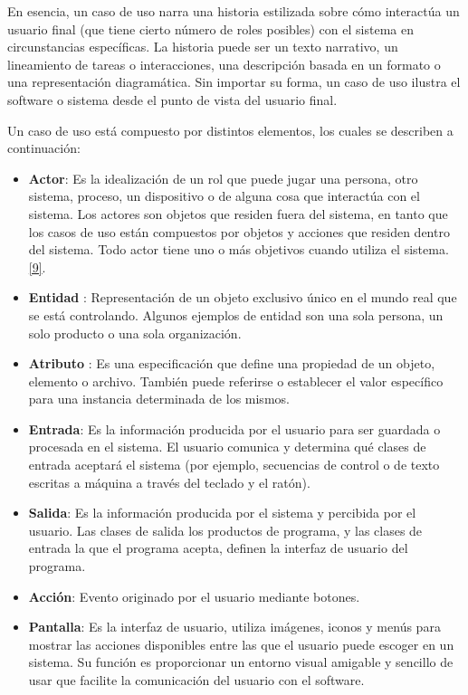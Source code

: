 En esencia, un caso de uso narra una historia estilizada sobre cómo interactúa un usuario final (que tiene cierto número de roles posibles) con el sistema en circunstancias específicas. La historia puede ser un texto narrativo, un lineamiento de tareas o interacciones, una descripción basada en un formato o una representación diagramática. Sin importar su forma, un caso de uso ilustra el software o sistema desde el punto de vista del usuario final.

Un caso de uso está compuesto por distintos elementos, los cuales se describen a continuación:
\begin{itemize}
\item \textbf{Actor}: Es la idealización de un rol que puede jugar una persona, otro sistema, proceso, un dispositivo o de alguna cosa que interactúa con el sistema. Los actores son objetos que residen fuera del sistema, en tanto que los casos de uso están compuestos por objetos y acciones que residen dentro del sistema. Todo actor tiene uno o más objetivos cuando utiliza el sistema.  \hyperlink{b09}{[9]}. 

\item \textbf{Entidad} : Representación de un objeto exclusivo único en el mundo real que se está controlando. Algunos ejemplos de entidad son una sola persona, un solo producto o una sola organización. 

\item \textbf{Atributo} : Es una especificación que define una propiedad de un objeto, elemento o archivo. También puede referirse o establecer el valor específico para una instancia determinada de los mismos.

\item \textbf{Entrada}: Es la información producida por el usuario para ser guardada o procesada en el sistema. El usuario comunica y determina qué clases de entrada aceptará el sistema (por ejemplo, secuencias de control o de texto escritas a máquina a través del teclado y el ratón).

\item \textbf{Salida}: Es la información producida por el sistema y percibida por el usuario. Las clases de salida los productos de programa, y las clases de entrada la que el programa acepta, definen la interfaz de usuario del programa.

\item \textbf{Acción}: Evento originado por el usuario mediante botones.

\item \textbf{Pantalla}: Es la interfaz de usuario, utiliza imágenes, iconos y menús para mostrar las acciones disponibles entre las que el usuario puede escoger en un sistema. Su función es proporcionar un entorno visual amigable y sencillo de usar que facilite la comunicación del usuario con el software.


\end{itemize}
